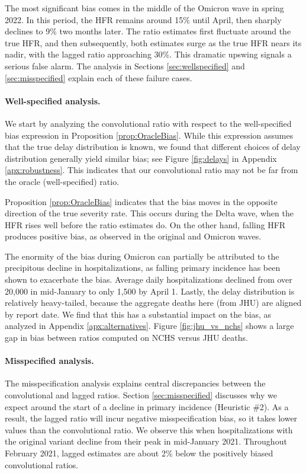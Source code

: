 \documentclass{article}
\begin{document}
The most significant bias comes in the middle of the Omicron wave in spring
2022. In this period, the HFR remains around 15\% until April, then sharply
declines to 9\% two months later. The ratio estimates first fluctuate around the
true HFR, and then subsequently, both estimates surge as the true HFR nears
its nadir, with the lagged ratio approaching 30\%. This dramatic upswing signals
a serious false alarm.  The analysis in Sections \ref{sec:wellspecified} and
\ref{sec:misspecified} explain each of these failure cases. 

\paragraph{Well-specified analysis.}

We start by analyzing the convolutional ratio with respect to the well-specified
bias expression in Proposition \ref{prop:OracleBias}. While this expression
assumes that the true delay distribution is known, we found that different
choices of delay distribution generally yield similar bias; see Figure \ref{fig:delays} in Appendix
\ref{apx:robustness}. This indicates that our convolutional ratio may 
not be far from the oracle (well-specified) ratio. 

Proposition \ref{prop:OracleBias} indicates that the bias moves in the opposite
direction of the true severity rate. This occurs during the Delta wave, when the
HFR rises well before the ratio estimates do. On the other hand, falling HFR
produces positive bias, as observed in the original and Omicron waves.  

The enormity of the bias during Omicron can partially be attributed to the
precipitous decline in hospitalizations, as falling primary incidence has been
shown to exacerbate the bias. Average daily hospitalizations declined from over
20,000 in mid-January to only 1,500 by April 1. Lastly, the delay distribution
is relatively heavy-tailed, because the aggregate deaths here (from JHU) are
aligned by report date. 
We find that this has a substantial impact on the bias, 
as analyzed in Appendix \ref{apx:alternatives}. 
Figure \ref{fig:jhu_vs_nchs} shows a large gap in bias between ratios computed on NCHS versus JHU deaths.

\paragraph{Misspecified analysis.}

The misspecification analysis explains central discrepancies between the
convolutional and lagged ratios. Section \ref{sec:misspecified} discusses why we 
expect  around the start of a decline in primary
incidence (Heuristic \#2). As a result, the lagged ratio will incur negative misspecification
bias, so it takes lower values than the convolutional ratio. 
We observe this when hospitalizations with the original variant
decline from their peak in mid-January 2021. Throughout February 2021, lagged
estimates are about 2\% below the positively biased convolutional ratios.   
\end{document}
